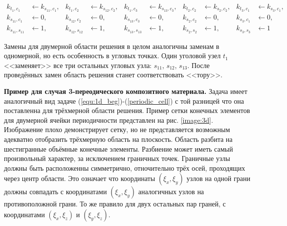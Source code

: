 \begin{align*}
    k_{t_1,c_1} &\leftarrow k_{s_{11},c_1}, & k_{t_1,c_2} &\leftarrow k_{s_{12},c_2}, & k_{t_1,c_3} &\leftarrow k_{s_{13},c_3}, & k_{t_2,c_2} &\leftarrow k_{s_2,c_2}, & k_{t_3,c_1} &\leftarrow k_{s_3,c_1}, \\
    k_{s_{11},c_1} &\leftarrow 0, & k_{s_{12},c_2} &\leftarrow 0, & k_{s_{13},c_3} &\leftarrow 0, & k_{s_2,c_2} &\leftarrow 0, & k_{s_3,c_1} &\leftarrow 0, \\
    k_{s_{11},s_{11}} &\leftarrow 1, & k_{s_{12},s_{12}} &\leftarrow 1, & k_{s_{13},s_{13}} &\leftarrow 1, & k_{s_2,s_2} &\leftarrow 1, & k_{s_3,s_3} &\leftarrow 1
\end{align*}

Замены для двумерной области решения в целом аналогичны заменам в одномерной, но есть особенность в угловых точках. 
Один уголовой узел $t_1$ <<заменяет>> все три остальных угловых узла: $s_{11}$, $s_{12}$, $s_{13}$.
После проведённых замен область решения станет соответствовать <<тору>>.

\textbf{Пример для случая 3-переодического композитного материала.} 
Задача имеет аналогичный вид задаче (\ref{equ:1d_beg})-(\ref{periodic_cell}) с той разницей что она поставленна для трёхмерной области решения. 
Пример сетки конечных элементов для двумерной ячейки периодичности представлен на рис. \ref{image:3d}.
Изображение плохо демонстрирует сетку, но не представляется возможным адекватно отобразить трёхмерную область на плоскость.
Область разбита на шестигранные объёмные конечные элементы. 
Разбиение может иметь самый произвольный характер, за исключением граничных точек.
Граничные узлы должны быть расположенны симметрично, отночительно трёх осей, проходящих через центр области.
Это означает что координаты $(\xi_x, \xi_y)$ узлов на одной грани должны совпадать с координатами $(\xi_x, \xi_y)$ аналогичных узлов на противоположной грани.
То же правило для двух остальных пар граней, с координатами $(\xi_x, \xi_z)$ и $(\xi_y, \xi_z)$.

